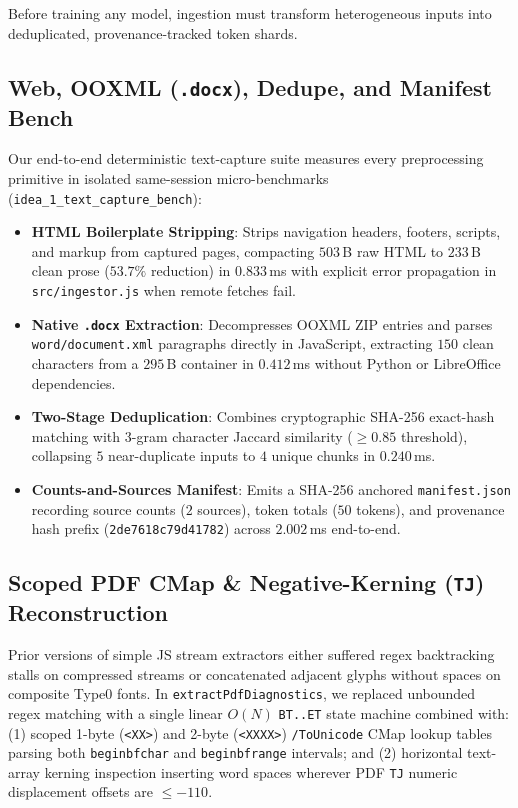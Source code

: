 \documentclass{article}
\begin{document}
Before training any model, ingestion must transform heterogeneous inputs into deduplicated, provenance-tracked token shards.

\subsection{Web, OOXML (\texttt{.docx}), Dedupe, and Manifest Bench}
Our end-to-end deterministic text-capture suite measures every preprocessing primitive in isolated same-session micro-benchmarks (\texttt{idea\_1\_text\_capture\_bench}):
\begin{itemize}
    \item \textbf{HTML Boilerplate Stripping}: Strips navigation headers, footers, scripts, and markup from captured pages, compacting $503$\,B raw HTML to $233$\,B clean prose ($53.7\%$ reduction) in $0.833$\,ms with explicit error propagation in \texttt{src/ingestor.js} when remote fetches fail.
    \item \textbf{Native \texttt{.docx} Extraction}: Decompresses OOXML ZIP entries and parses \texttt{word/document.xml} paragraphs directly in JavaScript, extracting $150$ clean characters from a $295$\,B container in $0.412$\,ms without Python or LibreOffice dependencies.
    \item \textbf{Two-Stage Deduplication}: Combines cryptographic SHA-256 exact-hash matching with 3-gram character Jaccard similarity ($\ge 0.85$ threshold), collapsing $5$ near-duplicate inputs to $4$ unique chunks in $0.240$\,ms.
    \item \textbf{Counts-and-Sources Manifest}: Emits a SHA-256 anchored \texttt{manifest.json} recording source counts ($2$ sources), token totals ($50$ tokens), and provenance hash prefix (\texttt{2de7618c79d41782}) across $2.002$\,ms end-to-end.
\end{itemize}

\subsection{Scoped PDF CMap \& Negative-Kerning (\texttt{TJ}) Reconstruction}
Prior versions of simple JS stream extractors either suffered regex backtracking stalls on compressed streams or concatenated adjacent glyphs without spaces on composite Type0 fonts. In \texttt{extractPdfDiagnostics}, we replaced unbounded regex matching with a single linear $O(N)$ \texttt{BT..ET} state machine combined with: (1) scoped 1-byte (\texttt{<XX>}) and 2-byte (\texttt{<XXXX>}) \texttt{/ToUnicode} CMap lookup tables parsing both \texttt{beginbfchar} and \texttt{beginbfrange} intervals; and (2) horizontal text-array kerning inspection inserting word spaces wherever PDF \texttt{TJ} numeric displacement offsets are $\le -110$.
\end{document}
